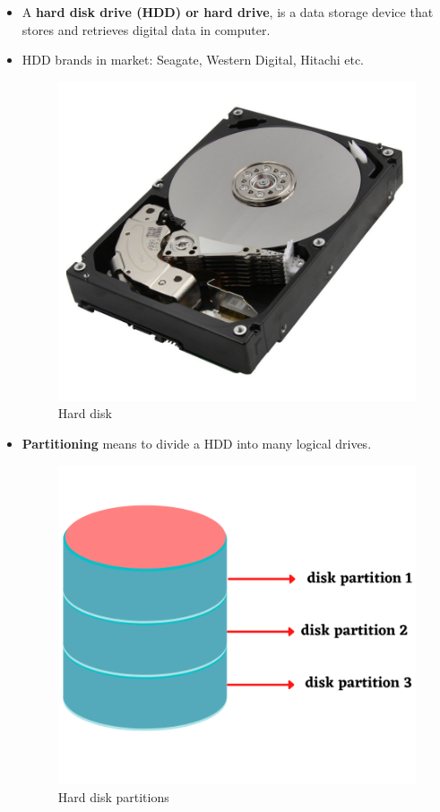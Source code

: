 \setlength{\columnsep}{3pt}
\begin{flushleft}
	\bigskip
	\begin{itemize}
		\item A \textbf{hard disk drive (HDD) or hard drive}, is a data storage device that stores and retrieves digital data in computer.
		\item HDD brands in market: Seagate, Western Digital, Hitachi etc.
			\begin{figure}[h!]
				\centering
				\includegraphics[scale=.3]{content/chapter8/images/hdd.png}
				\caption{Hard disk}
				\label{hard_disk}
			\end{figure}
		\item \textbf{Partitioning} means to divide a HDD into many logical drives.
		\begin{figure}[h!]
			\centering
			\includegraphics[scale=.3]{content/chapter8/images/part2.png}
			\caption{Hard disk partitions}
			\label{hard_disk_partitions}
		\end{figure}		
	\end{itemize}

\newpage

	
\end{flushleft}

\newpage

